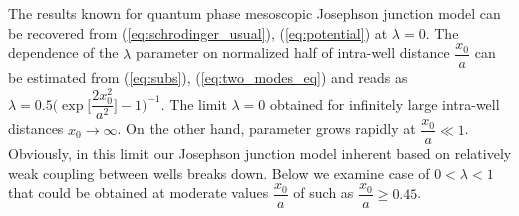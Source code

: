 \documentclass[aps, pre, preprint, groupedaddress, superscriptaddress, showkeys, showpacs] {revtex4-1}
\begin{document}
The results known for quantum phase mesoscopic Josephson junction model can be recovered from (\ref{eq:schrodinger_usual}), (\ref{eq:potential}) at $\lambda = 0$.
The dependence of the $\lambda$ parameter on normalized half of intra-well distance $\dfrac{x_0}{a}$ can be estimated from (\ref{eq:subs}), (\ref{eq:two_modes_eq}) and reads as $\lambda = 0.5 \Big( \exp \Big[ \dfrac{2 x_0^2}{a^2} \Big] - 1 \Big)^{-1}$.
The limit $\lambda = 0$ obtained for infinitely large intra-well distances $x_0 \to \infty$.
On the other hand, parameter grows rapidly at $\dfrac{x_0}{a} \ll 1$.
Obviously, in this limit our Josephson junction model inherent based on relatively weak coupling between wells breaks down.
Below we examine case of $0 < \lambda < 1$ that could be obtained at moderate values $\dfrac{x_0}{a}$ of such as $\dfrac{x_0}{a} \geq 0.45$. 
\end{document}

